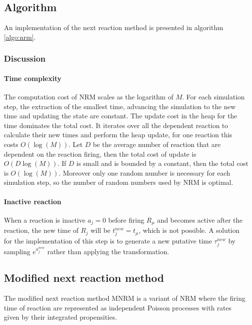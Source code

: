   \subsection{Algorithm}
  An implementation of the next reaction method is presented in algorithm \ref{algo:nrm}.

  

    \subsubsection{Discussion}

      \paragraph{Time complexity}
      The computation cost of NRM scales as the logarithm of $M$.
      For each simulation step, the extraction of the smallest time, advancing the simulation to the new time and updating the state are constant.
      The update cost in the heap for the time dominates the total cost.
      It iterates over all the dependent reaction to calculate their new times and perform the heap update, for one reaction this costs $O(\log(M))$.
      Let $D$ be the average number of reaction that are dependent on the reaction firing, then the total cost of update is $O(D\log(M))$.
      If $D$ is small and is bounded by a constant, then the total cost is $O(\log(M))$.
      Moreover only one random number is necessary for each simulation step, so the number of random numbers used by NRM is optimal.

      \paragraph{Inactive reaction}
      When a reaction is inactive $a_j = 0$ before firing $R_\mu$ and becomes active after the reaction, the new time of $R_j$ will be $t_j^{new} = t_\mu$, which is not possible.
      A solution for the implementation of this step is to generate a new putative time $\tau_j^{new}$ by sampling $e^{a_j^{new}}$ rather than applying the transformation.

  \subsection{Modified next reaction method}
  The modified next reaction method MNRM is a variant of NRM where the firing time of reaction are represented as independent Poisson processes with rates given by their integrated propensities.

